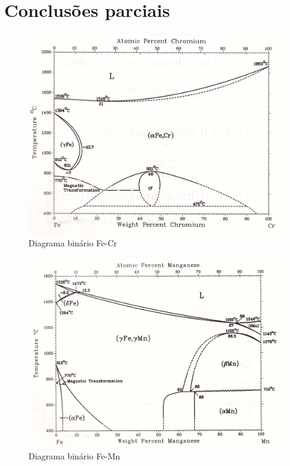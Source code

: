 \documentclass[brazil,tese,epusp]{usp}
\begin{document}
\chapter{Conclusões parciais}



\label{ap:composicao}

\label{ap:diag_bin}

\begin{figure}
  \includegraphics[width=1.1\textwidth]{img/Fe-Cr.jpg}
  \caption{Diagrama binário Fe-Cr}
  \label{fig:bin_fe-cr}
\end{figure}

\begin{figure}
  \includegraphics[width=1.1\textwidth]{img/Fe-Mn.jpg}
  \caption{Diagrama binário Fe-Mn}
  \label{fig:bin_fe-mn}
\end{figure}
\end{document}
